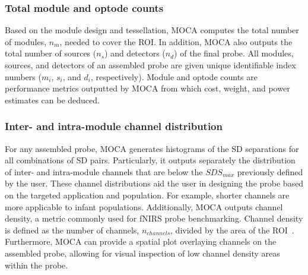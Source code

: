 \subsubsection{Total module and optode counts}
Based on the module design and tessellation, MOCA computes the total number of modules, $n_m$, needed to cover the ROI. In addition, MOCA also outputs the total number of sources ($n_s$) and detectors ($n_d$) of the final probe. All modules, sources, and detectors of an assembled probe are given unique identifiable index numbers ($m_i$, $s_i$, and $d_i$, respectively). Module and optode counts are performance metrics outputted by MOCA from which cost, weight, and power estimates can be deduced.

\subsubsection{Inter- and intra-module channel distribution}
For any assembled probe, MOCA generates histograms of the SD separations for all combinations of SD pairs. Particularly, it outputs separately the distribution of inter- and intra-module channels that are below the $SDS_{max}$ previously defined by the user. These channel distributions aid the user in designing the probe based on the targeted application and population. For example, shorter channels are more applicable to infant populations. Additionally, MOCA outputs channel density, a metric commonly used for \ac{fNIRS} probe benchmarking. Channel density is defined as the number of channels, $n_{channels}$, divided by the area of the ROI~\cite{Zhao2017}. Furthermore, MOCA can provide a spatial plot overlaying channels on the assembled probe, allowing for visual inspection of low channel density areas within the probe. 

